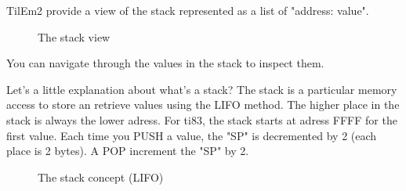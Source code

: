\documentclass[10pt]{report}
\begin{document}
TilEm2 provide a view of the stack represented as a list of "address: value".\newline
\begin{figure}[H]
\centering
{}
\caption{The stack view}
\end{figure}

You can navigate through the values in the stack to inspect them.\newline

Let's a little explanation about what's a stack?\newline
The stack is a particular memory access to store an retrieve values using the LIFO method.\newline
The higher place in the stack is always the lower adress.\newline
For ti83, the stack starts at adress FFFF for the first value.\newline
Each time you PUSH a value, the "SP" is decremented by 2 (each place is 2 bytes).\newline
A POP increment the "SP" by 2.\newline
\begin{figure}[H]
\centering
{}
\caption{The stack concept (LIFO)}
\end{figure}
\end{document}
